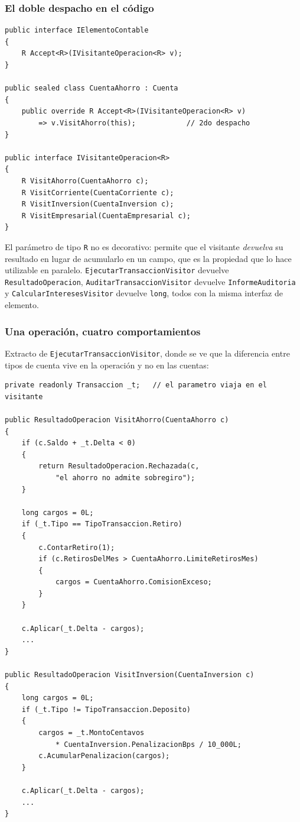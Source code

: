 \subsubsection*{El doble despacho en el código}

{\small
\begin{verbatim}
public interface IElementoContable
{
    R Accept<R>(IVisitanteOperacion<R> v);
}

public sealed class CuentaAhorro : Cuenta
{
    public override R Accept<R>(IVisitanteOperacion<R> v)
        => v.VisitAhorro(this);            // 2do despacho
}

public interface IVisitanteOperacion<R>
{
    R VisitAhorro(CuentaAhorro c);
    R VisitCorriente(CuentaCorriente c);
    R VisitInversion(CuentaInversion c);
    R VisitEmpresarial(CuentaEmpresarial c);
}
\end{verbatim}
}

El parámetro de tipo \texttt{R} no es decorativo: permite que el visitante \emph{devuelva} su
resultado en lugar de acumularlo en un campo, que es la propiedad que lo hace utilizable en
paralelo. \texttt{EjecutarTransaccionVisitor} devuelve \texttt{ResultadoOperacion},
\texttt{AuditarTransaccionVisitor} devuelve \texttt{InformeAuditoria} y
\texttt{CalcularInteresesVisitor} devuelve \texttt{long}, todos con la misma interfaz de
elemento.

\subsubsection*{Una operación, cuatro comportamientos}

Extracto de \texttt{EjecutarTransaccionVisitor}, donde se ve que la diferencia entre tipos de
cuenta vive en la operación y no en las cuentas:

{\small
\begin{verbatim}
private readonly Transaccion _t;   // el parametro viaja en el visitante

public ResultadoOperacion VisitAhorro(CuentaAhorro c)
{
    if (c.Saldo + _t.Delta < 0)
    {
        return ResultadoOperacion.Rechazada(c,
            "el ahorro no admite sobregiro");
    }

    long cargos = 0L;
    if (_t.Tipo == TipoTransaccion.Retiro)
    {
        c.ContarRetiro(1);
        if (c.RetirosDelMes > CuentaAhorro.LimiteRetirosMes)
        {
            cargos = CuentaAhorro.ComisionExceso;
        }
    }

    c.Aplicar(_t.Delta - cargos);
    ...
}

public ResultadoOperacion VisitInversion(CuentaInversion c)
{
    long cargos = 0L;
    if (_t.Tipo != TipoTransaccion.Deposito)
    {
        cargos = _t.MontoCentavos
            * CuentaInversion.PenalizacionBps / 10_000L;
        c.AcumularPenalizacion(cargos);
    }

    c.Aplicar(_t.Delta - cargos);
    ...
}
\end{verbatim}
}

